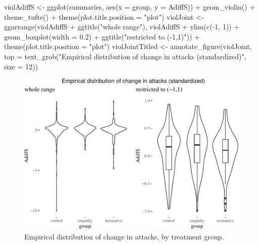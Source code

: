 \documentclass[
  10pt,
  dvipsnames, enabledeprecatedfontcommands]{scrartcl}
\newenvironment{Shaded}{\begin{snugshade}}{\end{snugshade}}
\newcommand{\AttributeTok}[1]{\textcolor[rgb]{0.77,0.63,0.00}{#1}}
\newcommand{\DecValTok}[1]{\textcolor[rgb]{0.00,0.00,0.81}{#1}}
\newcommand{\FloatTok}[1]{\textcolor[rgb]{0.00,0.00,0.81}{#1}}
\newcommand{\FunctionTok}[1]{\textcolor[rgb]{0.00,0.00,0.00}{#1}}
\newcommand{\NormalTok}[1]{#1}
\newcommand{\OtherTok}[1]{\textcolor[rgb]{0.56,0.35,0.01}{#1}}
\newcommand{\SpecialCharTok}[1]{\textcolor[rgb]{0.00,0.00,0.00}{#1}}
\newcommand{\StringTok}[1]{\textcolor[rgb]{0.31,0.60,0.02}{#1}}
\begin{document}
\begin{Shaded}
\begin{Highlighting}[]
\NormalTok{violAdiffS }\OtherTok{\textless{}{-}} \FunctionTok{ggplot}\NormalTok{(summaries, }\FunctionTok{aes}\NormalTok{(}\AttributeTok{x =}\NormalTok{ group, }\AttributeTok{y =}\NormalTok{ AdiffS)) }\SpecialCharTok{+} \FunctionTok{geom\_violin}\NormalTok{() }\SpecialCharTok{+}
    \FunctionTok{theme\_tufte}\NormalTok{() }\SpecialCharTok{+} \FunctionTok{theme}\NormalTok{(}\AttributeTok{plot.title.position =} \StringTok{"plot"}\NormalTok{)}
\NormalTok{violJoint }\OtherTok{\textless{}{-}} \FunctionTok{ggarrange}\NormalTok{(violAdiffS }\SpecialCharTok{+} \FunctionTok{ggtitle}\NormalTok{(}\StringTok{"whole range"}\NormalTok{), violAdiffS }\SpecialCharTok{+}
    \FunctionTok{ylim}\NormalTok{(}\FunctionTok{c}\NormalTok{(}\SpecialCharTok{{-}}\DecValTok{1}\NormalTok{, }\DecValTok{1}\NormalTok{)) }\SpecialCharTok{+} \FunctionTok{geom\_boxplot}\NormalTok{(}\AttributeTok{width =} \FloatTok{0.2}\NormalTok{) }\SpecialCharTok{+} \FunctionTok{ggtitle}\NormalTok{(}\StringTok{"restricted to ({-}1,1)"}\NormalTok{)) }\SpecialCharTok{+}
    \FunctionTok{theme}\NormalTok{(}\AttributeTok{plot.title.position =} \StringTok{"plot"}\NormalTok{)}
\NormalTok{violJointTitled }\OtherTok{\textless{}{-}} \FunctionTok{annotate\_figure}\NormalTok{(violJoint, }\AttributeTok{top =} \FunctionTok{text\_grob}\NormalTok{(}\StringTok{"Empirical distribution of change in attacks (standardized)"}\NormalTok{,}
    \AttributeTok{size =} \DecValTok{12}\NormalTok{))}
\end{Highlighting}
\end{Shaded}

\normalsize

\begin{figure}[H]

\begin{center}\includegraphics[width=1\linewidth]{technicalReport4_files/figure-latex/violJoint-1} \end{center}
\caption{Empirical distribution of change in attacks, by treatment group.}
\label{fig:violJoint}
\end{figure}
\end{document}
